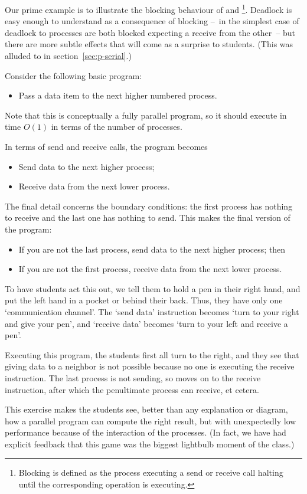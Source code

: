 Our prime example is to illustrate the blocking behaviour of
 and \footnote{Blocking is defined as the
  process executing a send or receive call halting until the
  corresponding operation is executing.}. Deadlock is easy enough to
understand as a consequence of blocking --~in the simplest case of
deadlock to processes are both blocked expecting a receive from the
other~-- but there are more subtle effects that will come as a
surprise to students. (This was alluded to in section~\ref{sec:p-serial}.)

Consider the following basic program:
\begin{itemize}
\item Pass a data item to the next higher numbered process.
\end{itemize}
Note that this is conceptually a fully parallel program, so it should
execute in time $O(1)$ in terms of the number of processes.

In terms of send and receive calls, the program becomes 
\begin{itemize}
\item Send data to the next higher process;
\item Receive data from the next lower process.
\end{itemize}
The final detail concerns the boundary conditions: the first process
has nothing to receive and the last one has nothing to send. This
makes the final version of the program:
\begin{itemize}
\item If you are not the last process, send data to the next higher
  process; then
\item If you are not the first process, receive data from the next
  lower process.
\end{itemize}
To have students act this out, we tell them to hold a pen in their
right hand, and put the left hand in a pocket or behind their
back. Thus, they have only one `communication channel'. The `send
data' instruction becomes `turn to your right and give your pen', and
`receive data' becomes `turn to your left and receive a pen'.

Executing this program, the students first all turn to the right, and
they see that giving data to a neighbor is not possible because no
one is executing the receive instruction. The last process is not
sending, so moves on to the receive instruction, after which the
penultimate process can receive, et cetera.

This exercise makes the students see, better than any explanation or
diagram, how a parallel program can compute the right result, but with
unexpectedly low performance because of the interaction of the processes.
(In fact, we have had explicit feedback that this game was
the biggest lightbulb moment of the class.)

